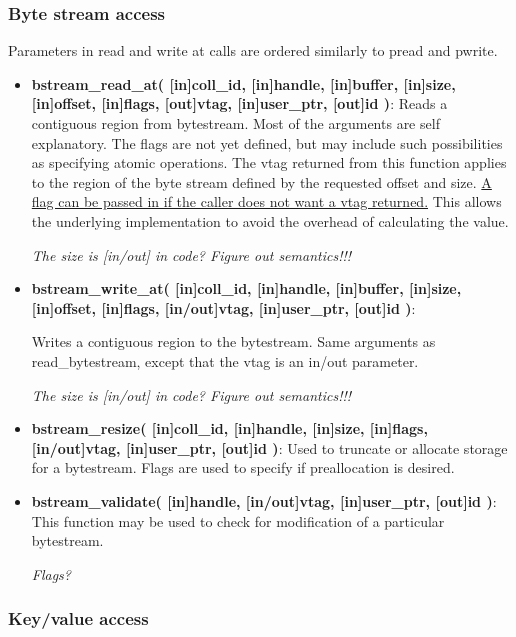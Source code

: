\documentclass[10pt]{article} %
\begin{document}
%
%
\subsubsection{Byte stream access}

Parameters in read and write at calls are ordered similarly to pread and pwrite.

\begin{itemize}
\item \textbf{bstream\_read\_at(
[in]coll\_id,
[in]handle, 
[in]buffer,
[in]size,
[in]offset,
[in]flags,
[out]vtag,
[in]user\_ptr,
[out]id
)}:
Reads a contiguous region from bytestream.  Most of the arguments are self
explanatory.  The flags are not yet defined, but may include such
possibilities as specifying atomic operations.  The vtag returned from this
function applies to the region of the byte stream defined by the requested
offset and size.  \underline{A flag can be passed in if the caller does not
want a vtag returned.}  This allows the underlying implementation to avoid the
overhead of calculating the value.

\emph{The size is [in/out] in code?  Figure out semantics!!!}

\item \textbf{bstream\_write\_at(
[in]coll\_id,
[in]handle,
[in]buffer,
[in]size,
[in]offset,
[in]flags,
[in/out]vtag,
[in]user\_ptr,
[out]id
)}:

Writes a contiguous region to the bytestream.  Same arguments as
read\_bytestream, except that the vtag is an in/out parameter.

\emph{The size is [in/out] in code?  Figure out semantics!!!}

\item \textbf{bstream\_resize(
[in]coll\_id,
[in]handle,
[in]size,
[in]flags,
[in/out]vtag,
[in]user\_ptr,
[out]id
)}:
Used to truncate or allocate storage for a bytestream.  Flags are used
to specify if preallocation is desired.

\item \textbf{bstream\_validate(
[in]handle,
[in/out]vtag,
[in]user\_ptr,
[out]id
)}:
This function may be used to check for modification of a particular
bytestream.  

\emph{Flags?}

\end{itemize}

%
%
\subsubsection{Key/value access}
\end{document}
